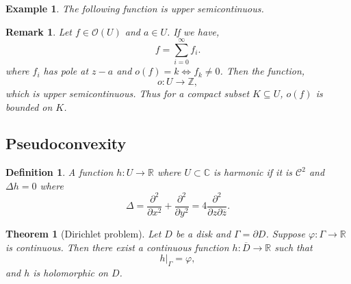 \documentclass{article}
\newtheorem{theorem}{Theorem} [section]
\newtheorem{definition}{Definition}[section]
\newtheorem{remark}{Remark}[section]
\newtheorem{example}{Example}[section]
\newcommand{\R}[0]{\mathbb{R}}
\newcommand{\Z}[0]{\mathbb{Z}}
\newcommand{\C}[0]{\mathbb{C}}
\newcommand{\bd}[0]{\partial}
\newcommand{\Ouv}[0]{\mathcal{O}}
\begin{document}
\begin{example}
  The following function is upper semicontinuous.
    \begin{center}
  \end{center}
\end{example}
\begin{remark}
  Let $f\in\Ouv(U)$ and $a\in U$. If we have,
  \begin{equation*}
    f = \sum_{i=0}^\infty f_i.
  \end{equation*}
  where $f_i$ has pole at $z-a$ and $o(f) = k\Leftrightarrow f_k\not=0$. Then the function,
  \begin{equation*}
    o:U\to\Z,
  \end{equation*}
  which is upper semicontinuous. Thus for a compact subset $K\subseteq U$, $o(f)$ is bounded on $K$.
\end{remark}

\subsection{Pseudoconvexity}

\begin{definition}
  A function $h:U\to \R$ where $U\subset\C$ is harmonic if it is $\mathcal{C}^2$ and $\Delta h = 0$ where 
  \begin{equation*}
    \Delta = {\frac {\partial^2} {\partial x^2}}+{\frac {\partial^2} {\partial y^2}} = 4{\frac {\partial^2} {\partial z\partial\overline{z}}}.
  \end{equation*}

\end{definition}

\begin{theorem}[Dirichlet problem]
  Let $D$ be a disk and $\Gamma = \bd D$. Suppose $\varphi:\Gamma\to\R$ is continuous. Then there exist a continuous function $h:\overline{D}\to\R$ such that 
  \begin{equation*}
    h|_\Gamma = \varphi,
  \end{equation*}
  and $h$ is holomorphic on $D$.
\end{theorem}
\end{document}
